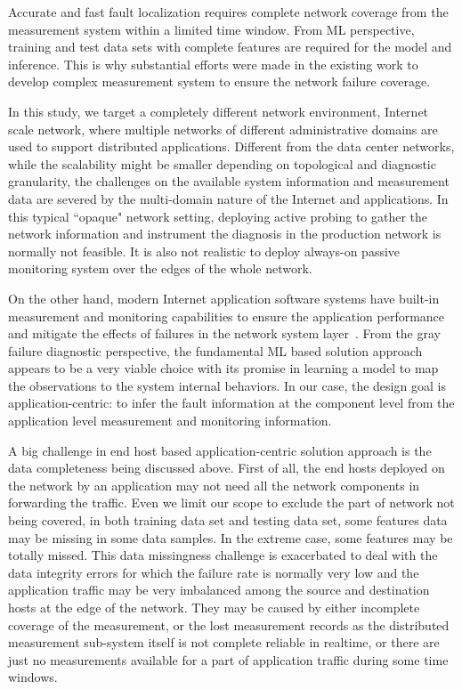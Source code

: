 Accurate and fast fault localization requires complete network coverage from the measurement system within a limited time window. 
From ML perspective, training and test data sets with complete features are required for the model and inference. 
This is why substantial efforts were made in the existing work to develop complex measurement system to ensure the network failure coverage. 

In this study, we target a completely different network environment, Internet scale network, where multiple networks of different 
administrative domains are used to support distributed applications. Different from the data center networks, while the scalability might be smaller 
depending on topological and diagnostic granularity, the challenges on the available system information and measurement data are 
severed by the multi-domain nature of the Internet and applications. In this typical ``opaque" network setting, deploying active probing 
to gather the network information and instrument the diagnosis in the production network is normally not feasible. It is also not realistic to deploy 
always-on passive monitoring system over the edges of the whole network.
 
On the other hand, modern Internet application software systems have built-in measurement and monitoring capabilities to ensure the application performance 
and mitigate the effects of failures in the network system layer~\cite{IntegrityVerification:DataTransfer,swip:pearc:2019,iris:ictc21}. 
From the gray failure diagnostic perspective, the fundamental ML based solution approach appears to be a very viable choice with its promise in 
learning a model to map the observations to the system internal behaviors. In our case, the design goal is application-centric: to infer the fault information at the 
component level from the application level measurement and monitoring information. 

A big challenge in end host based application-centric solution approach is the data completeness being discussed above. First of all, the end hosts deployed on the network 
by an application may not need all the network components in forwarding the traffic.  Even we limit our scope to exclude the part of network not being covered,  
in both training data set and testing data set, some features data may be missing in some data samples. In the extreme case, some features may be totally missed. 
This data missingness challenge is exacerbated to deal with the data integrity errors for which the failure rate is normally very low and the application traffic 
may be very imbalanced among the source and destination hosts at the edge of the network.
They may be caused by either incomplete coverage of the measurement, or the lost measurement records as the distributed measurement 
sub-system itself is not complete reliable in realtime, or there are just no measurements available for a part of application traffic during some time windows. 

